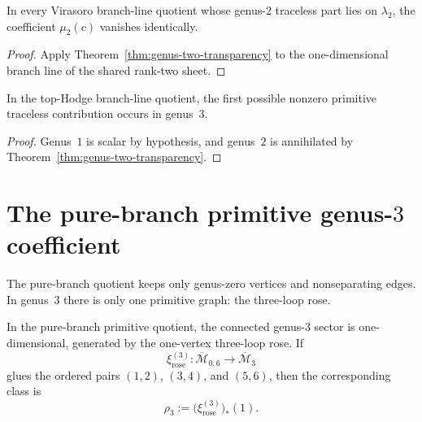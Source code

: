 \begin{corollary}
\label{cor:vir-genus-two-vanishing}
In every Virasoro branch-line quotient whose genus-\(2\) traceless part
lies on \(\lambda_2\), the coefficient \(\mu_2(c)\) vanishes
identically.
\end{corollary}

\begin{proof}
Apply Theorem~\ref{thm:genus-two-transparency} to the one-dimensional
branch line of the shared rank-two sheet.
\end{proof}

\begin{corollary}
\label{cor:first-primitive-genus-three}
In the top-Hodge branch-line quotient, the first possible nonzero
primitive traceless contribution occurs in genus~\(3\).
\end{corollary}

\begin{proof}
Genus~\(1\) is scalar by hypothesis, and genus~\(2\) is annihilated by
Theorem~\ref{thm:genus-two-transparency}.
\end{proof}

\section{The pure-branch primitive genus-\texorpdfstring{$3$}{3} coefficient}
\label{sec:blr-pure-branch-g3}

The pure-branch quotient keeps only genus-zero vertices and
nonseparating edges. In genus~\(3\) there is only one primitive graph:
the three-loop rose.

\begin{lemma}
\label{lem:genus-three-rose-unique}
In the pure-branch primitive quotient, the connected genus-\(3\)
sector is one-dimensional, generated by the one-vertex three-loop rose.
If
\[
\xi_{\mathrm{rose}}^{(3)}\colon
\overline{\mathcal M}_{0,6}
\longrightarrow
\overline{\mathcal M}_3
\]
glues the ordered pairs \((1,2)\), \((3,4)\), and \((5,6)\), then the
corresponding class is
\begin{equation}
\label{eq:rho-three-definition}
\rho_3:=\bigl(\xi_{\mathrm{rose}}^{(3)}\bigr)_*(1).
\end{equation}
\end{lemma}

